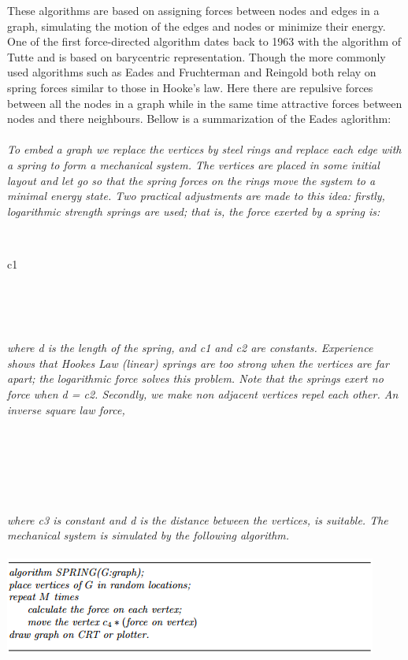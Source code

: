 \documentclass[a4paper,11pt]{kth-mag}
\begin{document}
These algorithms are based on assigning forces between nodes and edges in a graph, simulating the motion of the edges and nodes or minimize their energy. One of the first force-directed algorithm dates back to 1963 with 
the algorithm of Tutte\cite{tutteFD} and is based on barycentric representation\cite{1338}. Though the more commonly used algorithms such as Eades\cite{ead} and Fruchterman and Reingold\cite{fr} both relay on spring forces similar to those in
Hooke's law. Here there are repulsive forces between all the nodes in a graph while in the same time attractive forces between nodes and there neighbours. Bellow is a summarization of the Eades aglorithm\cite{1338}:\\
\\
\emph{To embed a graph we replace the vertices by steel rings and replace each edge with
a spring to form a mechanical system. The vertices are placed in some initial
layout and let go so that the spring forces on the rings move the system to a
minimal energy state. Two practical adjustments are made to this idea: firstly,
logarithmic strength springs are used; that is, the force exerted by a spring is:}
\\
\begin{mathsurround}
\\
\centerline{c1\times {}}
\\
\end{mathsurround}
\\
\\
\emph{where d is the length of the spring, and c1 and c2 are constants. Experience
shows that Hookes Law (linear) springs are too strong when the vertices are far
apart; the logarithmic force solves this problem. Note that the springs exert no
force when d = c2. Secondly, we make non adjacent vertices repel each other. An
inverse square law force,}
\\
\begin{mathsurround}
\\
\centerline{\math{}}
\\
\end{mathsurround}
\\
\\
\emph{where c3 is constant and d is the distance between the vertices, is suitable. The
mechanical system is simulated by the following algorithm.}
\\
\\
\includegraphics{FR-part2}\\
\\
\end{document}
